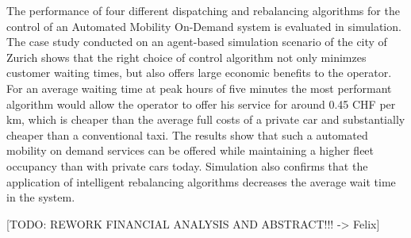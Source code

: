 The performance of four different dispatching and rebalancing algorithms for the
control of an Automated Mobility On-Demand system is evaluated in simulation.
The case study conducted on an agent-based simulation scenario of the city of Zurich
shows that the right choice of control algorithm not only minimzes customer waiting
times, but also offers large economic benefits to the operator. For an average
waiting time at peak hours of five minutes the most performant algorithm would allow
the operator to offer his service for around 0.45 CHF per km, which is cheaper than
the average full costs of a private car and substantially cheaper than a conventional
taxi. The results show that such a automated mobility on demand services can be offered
while maintaining a higher fleet occupancy than with private cars today. Simulation
also confirms that the application of intelligent rebalancing algorithms decreases
the average wait time in the system.

[TODO: REWORK FINANCIAL ANALYSIS AND ABSTRACT!!! -> Felix]
